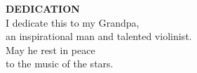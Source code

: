 \newpage
\thispagestyle{plain}%
\begin{center}
\vspace*{1.575in}
\textbf{DEDICATION}\\[2\baselineskip]
I dedicate this to my Grandpa,\\
an inspirational man and talented violinist.\\
May he rest in peace\\
to the music of the stars.
\end{center}%
\vfill
\newpage
